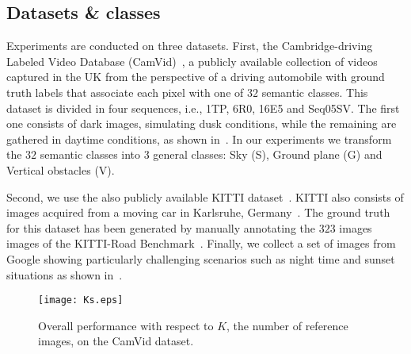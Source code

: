 \subsection{Datasets \& classes}
\label{subsect:datasets} Experiments are conducted on three
datasets. First, the Cambridge-driving Labeled Video Database
(CamVid)~\cite{CamVidBBDD:PRL2008}, a publicly available
collection of videos captured in the UK from the perspective of a
driving automobile with ground truth labels that associate each
pixel with one of $32$ semantic classes. This dataset is divided
in four sequences, i.e., 1TP, 6R0, 16E5 and Seq05SV. The first one
consists of dark images, simulating dusk conditions, while the
remaining are gathered in daytime conditions, as shown
in~. In our experiments we transform the
$32$ semantic classes into $3$ general classes: Sky (S),  Ground
plane (G) and Vertical obstacles (V).

Second, we use the also publicly available KITTI
dataset~\cite{KITTI}. KITTI also consists of images
acquired from a moving car in Karlsruhe,
Germany~. The ground truth for
this dataset has been generated by manually annotating the $323$
images images of the KITTI-Road Benchmark~\cite{Fritsch2013ITSC}.
Finally, we collect a set of images from Google showing
particularly challenging scenarios such as night time and sunset
situations as shown in~.
\begin{figure}[!t]
    \centering
    \texttt{[image: Ks.eps]}
    \vspace{-2mm}
    \caption[K-selection, overall performance analysis]{Overall performance with respect to $K$, the number of reference images, on the CamVid dataset.}
    \label{fig:Ks}
    \vspace{2mm}
\end{figure}
%

